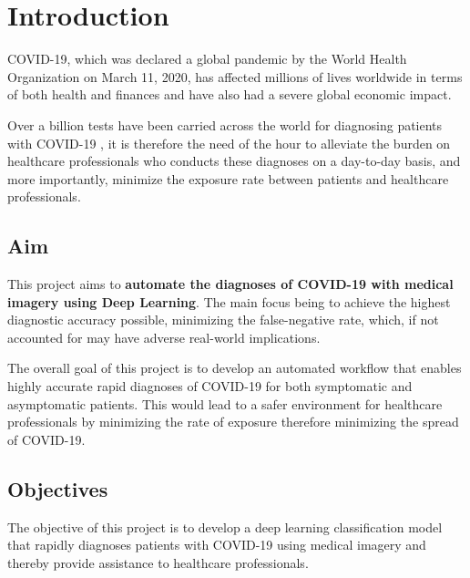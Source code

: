 
\chapter{Introduction} %

\label{ChapterX} %


COVID-19, which was declared a global pandemic by the World Health Organization on March 11, 2020, has affected
millions of lives worldwide in terms of both health and finances and have also had 
a severe global economic impact.

Over a billion tests have been carried across the world for diagnosing patients with COVID-19 \cite{STA21}, 
it is therefore the need of the hour to alleviate the burden on healthcare professionals who conducts these diagnoses on a day-to-day basis, 
and more importantly, minimize the exposure rate between patients and healthcare professionals.
\section{Aim}

This project aims to \textbf{automate the diagnoses of COVID-19 with medical imagery using Deep Learning}. The main focus being
to achieve the highest diagnostic accuracy possible, minimizing the false-negative rate, which, if not accounted for may have adverse real-world implications. 

The overall goal of this project is to develop an automated workflow that enables highly accurate rapid 
diagnoses of COVID-19 for both symptomatic and asymptomatic patients. This would lead to a safer environment 
for healthcare professionals by minimizing the rate of exposure 
therefore minimizing the spread of COVID-19.

\section{Objectives}

The objective of this project is to develop a deep learning classification model 
that rapidly diagnoses patients with COVID-19 using medical imagery and thereby provide assistance to healthcare professionals.

